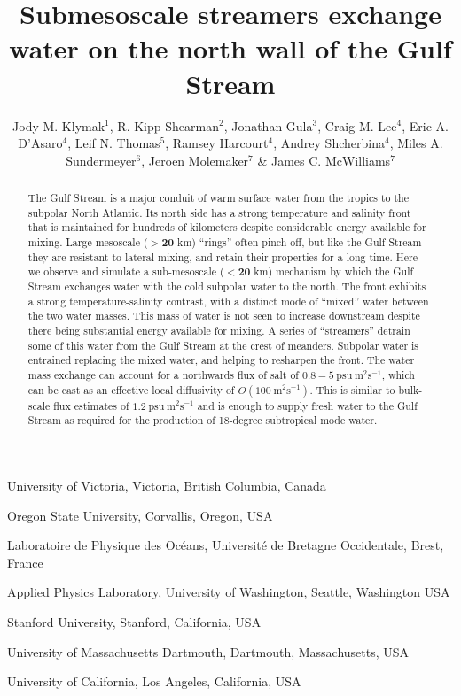 \documentclass{natureJMK}
\title{Submesoscale streamers exchange water on the north wall of the Gulf Stream}
\author{Jody M. Klymak$^{1}$, R. Kipp Shearman$^2$, Jonathan Gula$^3$, Craig M. Lee$^4$, Eric A. D'Asaro$^4$, Leif N. Thomas$^5$, Ramsey Harcourt$^4$, Andrey Shcherbina$^4$, Miles A. Sundermeyer$^6$, Jeroen Molemaker$^7$ \& James C. McWilliams$^7$}
\begin{document}
\maketitle


\begin{affiliations}
 \item University of Victoria, Victoria, British Columbia, Canada
 \item Oregon State University, Corvallis, Oregon, USA
 \item Laboratoire de Physique des Oc\'eans, Universit\'e de Bretagne Occidentale, Brest, France
 \item Applied Physics Laboratory, University of Washington, Seattle, Washington USA
 \item Stanford University, Stanford, California, USA
 \item University of Massachusetts Dartmouth, Dartmouth, Massachusetts, USA
 \item University of California, Los Angeles, California, USA 
\end{affiliations}

\begin{abstract}
The Gulf Stream is a major conduit of warm surface water from the tropics to the subpolar North Atlantic.  Its north side has a strong  temperature and salinity front that is maintained for hundreds of kilometers despite considerable energy available for mixing.  Large mesoscale ($\mathbf{>20}$ km) ``rings'' often pinch off, but like the Gulf Stream they are resistant to lateral mixing, and retain their properties for a long time.  Here we observe and simulate a sub-mesoscale ($\mathbf{<20}$ km) mechanism by which the Gulf Stream exchanges water with the cold subpolar water to the north. The front exhibits a strong temperature-salinity contrast, with a distinct mode of ``mixed'' water between the two water masses.  This mass of water is not seen to increase downstream  despite there being substantial energy available for mixing.  A series of ``streamers'' detrain some of this water from the Gulf Stream at the crest of meanders. Subpolar water is entrained replacing the  mixed water, and helping to resharpen the front. The water mass exchange can account for a northwards flux of salt of $0.8-5\ \mathrm{psu\ m^2s^{-1}}$, which can be cast as an effective local diffusivity of $O(100\ \mathrm{m^2s^{-1}})$. This is similar to bulk-scale flux estimates of $1.2\ \mathrm{psu\ m^2s^{-1}}$ and is enough to supply fresh water to the Gulf Stream as required for the production of 18-degree subtropical mode water. 
\end{abstract}
\end{document}
